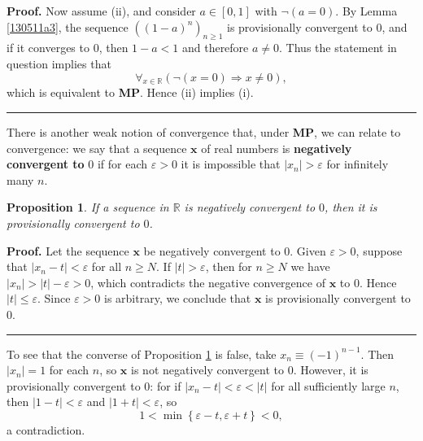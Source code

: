\documentclass[11pt]{article}%
\newtheorem{proposition}[theorem]{Proposition}
\newenvironment{proof}[1][Proof]{\noindent\textbf{#1.} }{\ \rule{0.5em}{0.5em}}
\begin{document}
\begin{proof}
Now assume (ii), and consider $a\in\left[  0,1\right]  $ with $\lnot\left(
a=0\right)  .$ By Lemma \ref{130511a3}, the sequence $\left(  \left(
1-a\right)  ^{n}\right)  _{n\geqslant1}$ is provisionally convergent to $0$,
and if it converges to $0$, then $1-a<1$ and therefore $a\neq0$. Thus the
statement in question implies that%
\[
\forall_{x\in\mathbb{R}}\left(  \lnot(x=0)\Rightarrow x\neq0\right)  ,
\]
which is equivalent to \textbf{MP}. Hence (ii) implies (i).
\end{proof}%

\bigskip


There is another weak notion of convergence that, under \textbf{MP}, we can
relate to convergence: we say that a sequence $\mathbf{x}$ of real numbers is
\textbf{negatively convergent to }$0$ if for each $\varepsilon>0$ it is
impossible that $\left\vert x_{n}\right\vert >\varepsilon$ for infinitely many
$n$.

\begin{proposition}
\label{3005a3}If a sequence in $\mathbb{R}$ is negatively convergent to $0$,
then it is provisionally convergent to $0$.
\end{proposition}

\begin{proof}
Let the sequence $\mathbf{x}$ be negatively convergent to $0$. Given
$\varepsilon>0$, suppose that $\left\vert x_{n}-t\right\vert <\varepsilon$ for
all $n\geqslant N$. If $\left\vert t\right\vert >\varepsilon$, then for
$n\geqslant N$ we have $\left\vert x_{n}\right\vert >\left\vert t\right\vert
-\varepsilon>0$, which contradicts the negative convergence of $\mathbf{x}$ to
$0$. Hence $\left\vert t\right\vert \leqslant\varepsilon$. Since
$\varepsilon>0$ is arbitrary, we conclude that $\mathbf{x}$ is provisionally
convergent to $0$.
\end{proof}%

\bigskip


To see that the converse of Proposition \ref{3005a3} is false, take
$x_{n}\equiv\left(  -1\right)  ^{n-1}$. Then $\left\vert x_{n}\right\vert =1$
for each $n$, so $\mathbf{x}$ is not negatively convergent to $0$. However, it
is provisionally convergent to $0$: for if $\left\vert x_{n}-t\right\vert
<\varepsilon<\left\vert t\right\vert $ for all sufficiently large $n$, then
$\left\vert 1-t\right\vert <\varepsilon$ and $\left\vert 1+t\right\vert
<\varepsilon$, so%
\[
1<\min\left\{  \varepsilon-t,\varepsilon+t\right\}  <0,
\]
a contradiction.
\end{document}
